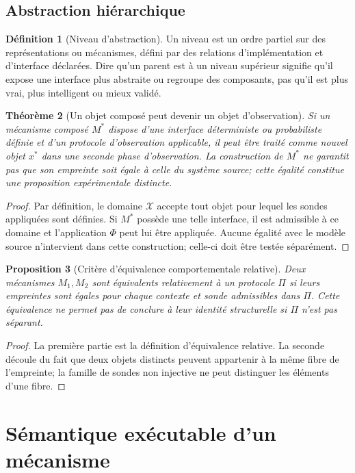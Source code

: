 \documentclass[11pt,oneside]{book}
\newtheorem{theoreme}{Théorème}[chapter]
\newtheorem{proposition}[theoreme]{Proposition}
\theoremstyle{definition}
\newtheorem{definition}[theoreme]{Définition}
\theoremstyle{remark}
\newcommand{\X}{\mathcal X}
\newcommand{\1}{\mathbf 1}
\begin{document}
\section{Abstraction hiérarchique}
\begin{definition}[Niveau d'abstraction]
Un niveau est un ordre partiel sur des représentations ou mécanismes, défini par des relations d'implémentation et d'interface déclarées. Dire qu'un parent est à un niveau supérieur signifie qu'il expose une interface plus abstraite ou regroupe des composants, pas qu'il est plus vrai, plus intelligent ou mieux validé.
\end{definition}

\begin{theoreme}[Un objet composé peut devenir un objet d'observation]
Si un mécanisme composé $M^*$ dispose d'une interface déterministe ou probabiliste définie et d'un protocole d'observation applicable, il peut être traité comme nouvel objet $x^*$ dans une seconde phase d'observation. La construction de $M^*$ ne garantit pas que son empreinte soit égale à celle du système source; cette égalité constitue une proposition expérimentale distincte.
\end{theoreme}
\begin{proof}
Par définition, le domaine $\X$ accepte tout objet pour lequel les sondes appliquées sont définies. Si $M^*$ possède une telle interface, il est admissible à ce domaine et l'application $\Phi$ peut lui être appliquée. Aucune égalité avec le modèle source n'intervient dans cette construction; celle-ci doit être testée séparément.
\end{proof}

\begin{proposition}[Critère d'équivalence comportementale relative]
Deux mécanismes $M_1,M_2$ sont équivalents relativement à un protocole $\Pi$ si leurs empreintes sont égales pour chaque contexte et sonde admissibles dans $\Pi$. Cette équivalence ne permet pas de conclure à leur identité structurelle si $\Pi$ n'est pas séparant.
\end{proposition}
\begin{proof}
La première partie est la définition d'équivalence relative. La seconde découle du fait que deux objets distincts peuvent appartenir à la même fibre de l'empreinte; la famille de sondes non injective ne peut distinguer les éléments d'une fibre.
\end{proof}

\chapter{Sémantique exécutable d'un mécanisme}
\end{document}
